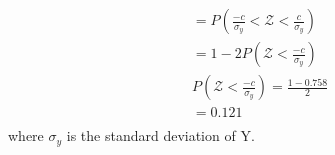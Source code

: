 \documentclass{article}
\begin{document}
\begin{enumerate}[label=\alph*)]
\begin{align*}
              = P(\frac{-c}{\sigma_y} < \mathcal{Z} < \frac{c}{\sigma_y})                                            \\
              = 1 - 2P(\mathcal{Z} < \frac{-c}{\sigma_y})                                                            \\
              P(\mathcal{Z}<\frac{-c}{\sigma_y}) = \frac{1-0.758}{2}                                                 \\
              =                                  0.121                                                               \\
          \end{align*}
          where \(\sigma_y\) is the standard deviation of Y.
\end{enumerate}
\end{document}
